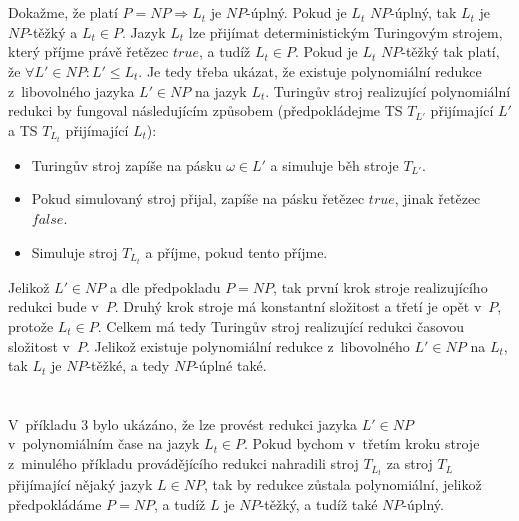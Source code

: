 \documentclass[a4paper]{article}
\newcommand{\ltl}{L_t}
\begin{document}
\section*{}
Dokažme, že platí $P=NP \Rightarrow \ltl$ je $NP$-úplný.
Pokud je $\ltl$ $NP$-úplný, tak $\ltl$ je $NP$-těžký a $\ltl \in P$.
Jazyk $\ltl$ lze přijímat deterministickým Turingovým strojem, který příjme právě řetězec $true$, a tudíž $\ltl \in P$.
Pokud je $\ltl$ $NP$-těžký tak platí, že $\forall L' \in NP: L' \leq \ltl$.
Je tedy třeba ukázat, že existuje polynomiální redukce z~libovolného jazyka $L' \in NP$ na jazyk $\ltl$.
Turingův stroj realizující polynomiální redukci by fungoval následujícím způsobem (předpokládejme TS $T_{L'}$ přijímající $L'$ a TS $T_{\ltl}$
přijímající $\ltl$):
\begin{itemize}
    \item Turingův stroj zapíše na pásku $\omega \in L'$ a simuluje běh stroje $T_{L'}$.
    \item Pokud simulovaný stroj přijal, zapíše na pásku řetězec $true$, jinak řetězec $false$.
    \item Simuluje stroj $T_{\ltl}$ a příjme, pokud tento příjme.
\end{itemize}
Jelikož $L' \in NP$ a dle předpokladu $P=NP$, tak první krok stroje realizujícího redukci bude v~$P$.
Druhý krok stroje má konstantní složitost a třetí je opět v~$P$, protože $\ltl \in P$.
Celkem má tedy Turingův stroj realizující redukci časovou složitost v~$P$.
Jelikož existuje polynomiální redukce z~libovolného $L' \in NP$ na $\ltl$, tak $\ltl$ je $NP$-těžké, a tedy $NP$-úplné také.

\section*{}
V~příkladu 3 bylo ukázáno, že lze provést redukci jazyka $L' \in NP$ v~polynomiálním čase na jazyk $\ltl \in P$.
Pokud bychom v~třetím kroku stroje z~minulého příkladu provádějícího redukci nahradili stroj $T_{\ltl}$ za stroj $T_L$ přijímající
nějaký jazyk $L\in NP$, tak by redukce zůstala polynomiální, jelikož předpokládáme $P=NP$, a tudíž $L$ je $NP$-těžký, a tudíž také
$NP$-úplný.
\end{document}
